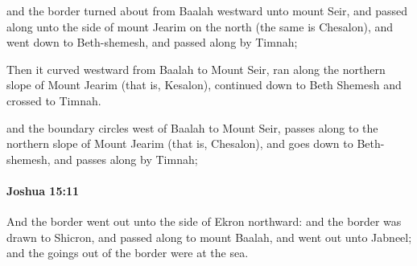 			\begin{versebox}
					\item[BHS] 
					\item[ASV] and the border turned about from Baalah westward unto mount Seir, and passed along unto the side of mount Jearim on the north (the same is Chesalon), and went down to Beth-shemesh, and passed along by Timnah;
					\item[NIV] Then it curved westward from Baalah to Mount Seir, ran along the northern slope of Mount Jearim (that is, Kesalon), continued down to Beth Shemesh and crossed to Timnah.
					\item[NRSV] and the boundary circles west of Baalah to Mount Seir, passes along to the northern slope of Mount Jearim (that is, Chesalon), and goes down to Beth-shemesh, and passes along by Timnah;
			\end{versebox}

		\paragraph{Joshua 15:11} %
			\label{JOSHUA-15-11}

			And the border went out unto the side of Ekron northward: and the border was drawn to Shicron, and passed along to mount Baalah, and went out unto Jabneel; and the goings out of the border were at the sea.

